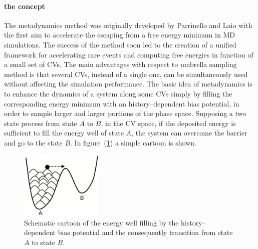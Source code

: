 \paragraph{\textbf{the concept}} The metadynamics method was originally developed by Parrinello and Laio 
\cite{MetadParrinello} with the first aim to accelerate the escaping from a free energy minimum in \ac{MD} 
simulations. The success of the method soon led to the creation of a unified framework for accelerating rare 
events and computing free energies in function of a small set of \acp{CV}. The main advantages with respect to 
umbrella sampling method is that several \acp{CV}, instead of a single one, can be simultaneously used without 
affecting the simulation performance. The basic idea of metadynamics is to enhance the dynamics of a system along 
some \acp{CV} simply by filling the corresponding energy minimum with an history--dependent bias potential, in 
order to sample larger and larger portions of the phase space. Supposing a two state process from state $A$ to 
$B$, in the \ac{CV} space, if the deposited energy is sufficient to fill the energy well of state $A$, the system 
can overcome the barrier and go to the state $B$. In figure~(\ref{fig:fancyMetadyn}) a simple cartoon is shown. 
\begin{figure}
	\includegraphics[width=0.35\textwidth]{./img/fancyMetadyn}
	\caption{Schematic cartoon of the energy well filling by the history--dependent bias potential and the consequently transition from state $A$ to state $B$.}%
	\label{fig:fancyMetadyn}
\end{figure}

